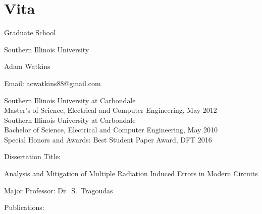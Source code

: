 

\chapter*{Vita}



\setlength{\baselineskip}{14pt}
\setlength{\parindent}{0pt}
\setlength{\parskip}{14pt}

\centerline{Graduate School}
\centerline{Southern Illinois University}

\bigskip
Adam Watkins \hfill 

\vskip4pt
Email: acwatkins88@gmail.com
\vskip4pt

Southern Illinois University at Carbondale\\
Master's of Science, Electrical and Computer Engineering, May 2012\\
\vspace{16pt}
Southern Illinois University at Carbondale\\
Bachelor of Science, Electrical and Computer Engineering, May 2010\\

\vspace{16pt}
Special Honors and Awards: Best Student Paper Award, DFT 2016

\vspace{4pt}
Dissertation Title: 

\vspace{-2pt}  %
{
Analysis and Mitigation of Multiple Radiation Induced Errors in Modern Circuits
\par}

\vspace{8pt}
Major Professor: Dr.\ S.\ Tragoudas

\vspace{8pt}
Publications: 

